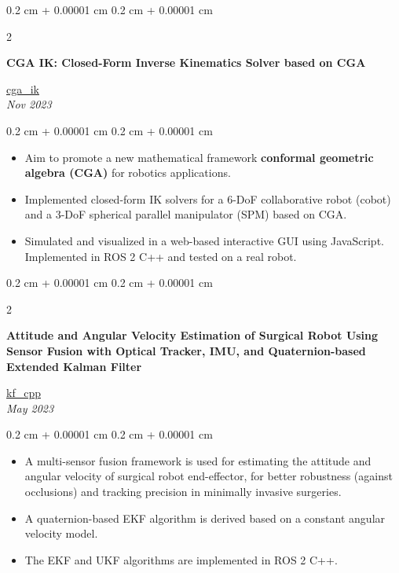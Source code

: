 \documentclass[10pt, letterpaper]{article}
\newenvironment{highlights}{
    \begin{itemize}[
        topsep=0.10 cm,
        parsep=0.10 cm,
        partopsep=0pt,
        itemsep=0pt,
        leftmargin=0.4 cm + 10pt
    ]
}{
    \end{itemize}
} %
\newenvironment{onecolentry}{
    \begin{adjustwidth}{
        0.2 cm + 0.00001 cm
    }{
        0.2 cm + 0.00001 cm
    }
}{
    \end{adjustwidth}
} %
\newenvironment{twocolentry}[2][4.5 cm]{
    \needspace{4\baselineskip}%
    \onecolentry
    \def\secondColumn{#2}
    \setcolumnwidth{\fill, #1}
    \begin{paracol}{2}
}{
    \switchcolumn \raggedleft \secondColumn
    \end{paracol}
    \endonecolentry
} %
\let\hrefWithoutArrow\href
\renewcommand{\href}[2]{\hrefWithoutArrow{#1}{\ifthenelse{\equal{#2}{}}{ }{#2 }\raisebox{.15ex}{\footnotesize \faExternalLink*}}}
\begin{document}
        \begin{twocolentry}[4.9 cm]{
        \hrefWithoutArrow{https://github.com/wei-hsuan-cheng/cga_ik}{{\footnotesize\faGithub}\hspace*{0.13cm}cga\_ik}\\\textit{Nov 2023}
        }
            \textbf{CGA IK: Closed-Form Inverse Kinematics Solver based on CGA}
        \end{twocolentry}
        \vspace{0.10 cm}
        \begin{onecolentry}
            \begin{highlights}
                \item Aim to promote a new mathematical framework \textbf{conformal geometric algebra (CGA)} for robotics applications. 
                \item Implemented closed-form IK solvers for a 6-DoF collaborative robot (cobot) and a 3-DoF spherical parallel manipulator (SPM) based on CGA.
                \item Simulated and visualized in a web-based interactive GUI using JavaScript. Implemented in ROS 2 C++ and tested on a real robot.
            \end{highlights}
        \end{onecolentry}
        \vspace{0.2 cm}

        \begin{twocolentry}[4.9 cm]{
            \hrefWithoutArrow{https://github.com/wei-hsuan-cheng/kf_cpp}{{\footnotesize\faGithub}\hspace*{0.13cm}kf\_cpp}\\\textit{May 2023}
            }

            \textbf{Attitude and Angular Velocity Estimation of Surgical Robot Using Sensor Fusion with Optical Tracker, IMU, and Quaternion-based Extended Kalman Filter}
        \end{twocolentry}
        \vspace{0.10 cm}
        \begin{onecolentry}
            \begin{highlights}
                \item A multi-sensor fusion framework is used for estimating the attitude and angular velocity of surgical robot end-effector, for better robustness (against occlusions) and tracking precision in minimally invasive surgeries.
                \item A quaternion-based EKF algorithm is derived based on a constant angular velocity model.
                \item The EKF and UKF algorithms are implemented in ROS 2 C++.
            \end{highlights}
        \end{onecolentry}
\end{document}
